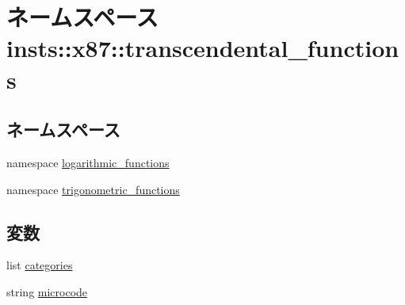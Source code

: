 \hypertarget{namespaceinsts_1_1x87_1_1transcendental__functions}{
\section{ネームスペース insts::x87::transcendental\_\-functions}
\label{namespaceinsts_1_1x87_1_1transcendental__functions}
}
\subsection*{ネームスペース}
\begin{DoxyCompactItemize}
\item 
namespace \hyperlink{namespaceinsts_1_1x87_1_1transcendental__functions_1_1logarithmic__functions}{logarithmic\_\-functions}
\item 
namespace \hyperlink{namespaceinsts_1_1x87_1_1transcendental__functions_1_1trigonometric__functions}{trigonometric\_\-functions}
\end{DoxyCompactItemize}
\subsection*{変数}
\begin{DoxyCompactItemize}
\item 
list \hyperlink{namespaceinsts_1_1x87_1_1transcendental__functions_a273cf0f1630af14c1582f05e53354a55}{categories}
\item 
string \hyperlink{namespaceinsts_1_1x87_1_1transcendental__functions_a770f11a173e99389a8802f0107ed8f52}{microcode}
\end{DoxyCompactItemize}


